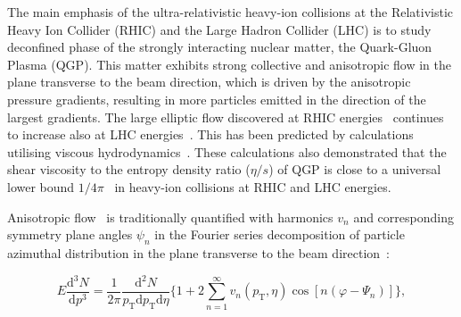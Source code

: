 \documentclass[ALICE,manyauthors]{cernphprep}
\begin{document}
The main emphasis of the ultra-relativistic heavy-ion collisions at the Relativistic Heavy Ion Collider (RHIC) and the Large Hadron Collider (LHC) is to study deconfined phase of the strongly interacting nuclear matter, the Quark-Gluon Plasma (QGP). 
This matter exhibits strong collective and anisotropic flow in the plane transverse to the beam direction, which is driven by the anisotropic pressure gradients, resulting in more particles emitted in the direction of the largest gradients.
The large elliptic flow discovered at RHIC energies~\cite{Ackermann:2000tr} continues to increase also at LHC energies~\cite{Aamodt:2010pa,Adam:2016izf}. This has been predicted by calculations utilising viscous hydrodynamics~\cite{Romatschke:2007mq,Shen:2011eg,Schenke:2011zz,Bozek:2012qs,Gale:2012rq,Hirano:2010je}.
These calculations also demonstrated that the shear viscosity to the entropy density ratio ($\eta/s$) of QGP is close to a universal lower bound $1/4\pi$~\cite{Kovtun:2004de} in heavy-ion collisions at RHIC and LHC energies.

Anisotropic flow~\cite{Ollitrault:1992bk} is traditionally quantified with harmonics $v_n$ and corresponding symmetry plane angles $\psi_n$ in the Fourier series decomposition of particle azimuthal distribution in the plane transverse to the beam direction~\cite{Voloshin:1994mz}:

\begin{equation}
E\frac{\mathrm{d}^3N}{\mathrm{d}p^3} = \frac{1}{2\pi}\frac{\mathrm{d}^2N}{p_{\mathrm{T}}\mathrm{d}p_{\mathrm{T}}\mathrm{d}\eta} \Big\{1 + 2\sum_{n=1}^{\infty} v_n(p_{\mathrm{T}},\eta) \cos[n(\varphi - \Psi_n)]\Big\},
\label{Eq:Fourier}
\end{equation}
\end{document}
